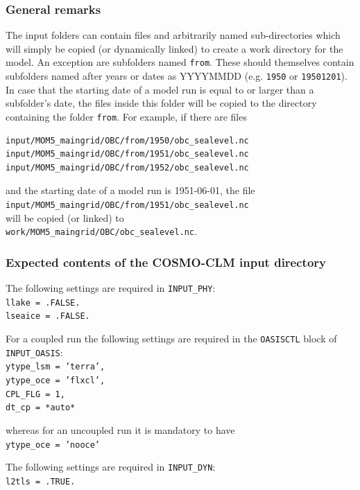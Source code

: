\documentclass[a4paper,titlepage]{scrartcl}
\begin{document}
\subsubsection{General remarks}
The input folders can contain files and arbitrarily named sub-directories which will simply be copied (or dynamically linked) to create a work directory for the model.
An exception are subfolders named \texttt{from}.
These should themselves contain subfolders named after years or dates as YYYYMMDD (e.g. \texttt{1950} or \texttt{19501201}).
In case that the starting date of a model run is equal to or larger than a subfolder's date, the files inside this folder will be copied to the directory containing the folder \texttt{from}.
For example, if there are files
\begin{verbatim}
input/MOM5_maingrid/OBC/from/1950/obc_sealevel.nc
input/MOM5_maingrid/OBC/from/1951/obc_sealevel.nc
input/MOM5_maingrid/OBC/from/1952/obc_sealevel.nc
\end{verbatim}
and the starting date of a model run is 1951-06-01, the file\\ 
\texttt{input/MOM5\_maingrid/OBC/from/1951/obc\_sealevel.nc}\\
will be copied (or linked) to \\
\texttt{work/MOM5\_maingrid/OBC/obc\_sealevel.nc}.

\subsubsection{Expected contents of the COSMO-CLM input directory}
The following settings are required in \texttt{INPUT\_PHY}:\\
\texttt{llake = .FALSE.}\\
\texttt{lseaice = .FALSE.}

For a coupled run the following settings are required in the \texttt{OASISCTL} block of \texttt{INPUT\_OASIS}:\\
\texttt{ytype\_lsm = 'terra',}\\
\texttt{ytype\_oce = 'flxcl',}\\
\texttt{CPL\_FLG  = 1,}\\
\texttt{dt\_cp = *auto*}
 
whereas for an uncoupled run it is mandatory to have\\
\texttt{ytype\_oce = 'nooce'}

The following settings are required in \texttt{INPUT\_DYN}:\\
\texttt{l2tls = .TRUE.}
\end{document}
